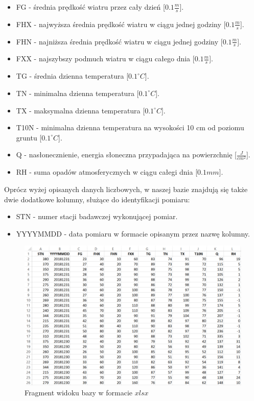 \documentclass{classrep}
\begin{document}
\begin{itemize}[label=$\bullet$\scshape\bfseries]
\item FG - średnia prędkość wiatru przez cały dzień [$0.1 \frac{m}{s}$].
\item FHX - najwyższa średnia prędkość wiatru w ciągu jednej godziny [$0.1 \frac{m}{s}$].
\item FHN - najniższa średnia prędkość wiatru w ciągu jednej godziny [$0.1 \frac{m}{s}$].
\item FXX - najszybszy podmuch wiatru w ciągu całego dnia [$0.1 \frac{m}{s}$].
\item TG - średnia dzienna temperatura [$0.1^{\circ} C$].
\item TN - minimalna dzienna temperatura [$0.1^{\circ} C$].
\item TX - maksymalna dzienna temperatura [$0.1^{\circ} C$].
\item T10N - minimalna dzienna temperatura na wysokości 10 cm od poziomu gruntu [$0.1^{\circ} C$].
\item Q - nasłonecznienie, energia słoneczna przypadająca na powierzchnię [$\frac{J}{cm^2}$].
\item RH - suma opadów atmosferycznych w ciągu całegi dnia [$0.1 mm$].\newline
\end{itemize}

Oprócz wyżej opisanych danych liczbowych, w naszej bazie znajdują się także dwie dodatkowe kolumny, służące do identyfikacji pomiaru:
\begin{itemize}[label=$\bullet$\scshape\bfseries]
\item STN - numer stacji badawczej wykonującej pomiar.
\item YYYYMMDD - data pomiaru w formacie opisanym przez nazwę kolumny.
\end{itemize}

\begin{figure}[H]
	\centering
	\includegraphics[width=1\textwidth]{Pictures/baza.png}
	\caption{Fragment widoku bazy w formacie $xlsx$}
\end{figure}
\end{document}

